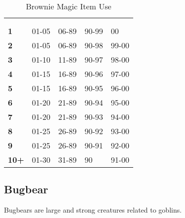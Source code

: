 \begin{multicols*}{2}
\begin {table}[H]
  \caption{Brownie Magic Item Use}\label{tab:Brownie Magic Item Use}
  \begin{tabularx}{\columnwidth}{>{\bfseries}YYYYY}
	\thead{} & \\
	 &  &  &  & \\
	1 & 01-05 & 06-89 & 90-99 & 00\\
	2 & 01-05 & 06-89 & 90-98 & 99-00\\
	3 & 01-10 & 11-89 & 90-97 & 98-00\\
	4 & 01-15 & 16-89 & 90-96 & 97-00\\
	5 & 01-15 & 16-89 & 90-95 & 96-00\\
	6 & 01-20 & 21-89 & 90-94 & 95-00\\
	7 & 01-20 & 21-89 & 90-93 & 94-00\\
	8 & 01-25 & 26-89 & 90-92 & 93-00\\
	9 & 01-25 & 26-89 & 90-91 & 92-00\\
	10+ & 01-30 & 31-89 & 90 & 91-00
  \end {tabularx}
\end {table}

\subsection{Bugbear}

Bugbears are large and strong creatures related to goblins.


\end{multicols*}
